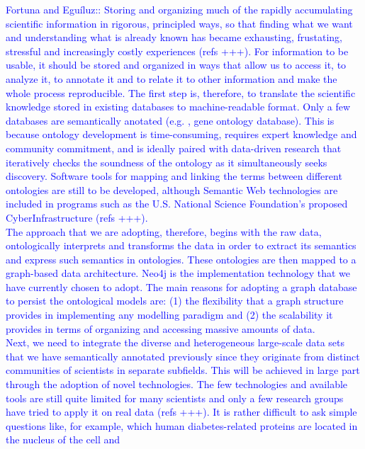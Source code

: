 \documentclass[11pt, a4paper]{article} %
\begin{document}
\textcolor{blue}{Fortuna and Egu\'iluz:: Storing and organizing much
  of the rapidly accumulating scientific information in rigorous,
  principled ways, so that finding what we want and understanding what
  is already known has became exhausting, frustating, stressful and
  increasingly costly experiences (refs +++). For information to be
  usable, it should be stored and organized in ways that allow us to
  access it, to analyze it, to annotate it and to relate it to other
  information and make the whole process reproducible. The first step
  is, therefore, to translate the scientific knowledge stored in
  existing databases to machine-readable format. Only a few databases
  are semantically anotated (e.g. , gene ontology database). This is
  because ontology development is time-consuming, requires expert
  knowledge and community commitment, and is ideally paired with
  data-driven research that iteratively checks the soundness of the
  ontology as it simultaneously seeks discovery. Software tools for
  mapping and linking the terms between different ontologies are still
  to be developed, although Semantic Web technologies are included in
  programs such as the U.S. National Science Foundation's proposed
  CyberInfrastructure (refs +++).\\
  The approach that we are adopting, therefore, begins with the raw
  data, ontologically interprets and transforms the data in order to
  extract its semantics and express such semantics in
  ontologies. These ontologies are then mapped to a graph-based data
  architecture. Neo4j is the implementation technology that we have
  currently chosen to adopt. The main reasons for adopting a graph
  database to persist the ontological models are: (1) the flexibility
  that a graph structure provides in implementing any modelling
  paradigm and (2) the scalability it provides in terms of organizing
  and accessing massive amounts of data.\\
  Next, we need to integrate the diverse and heterogeneous large-scale
  data sets that we have semantically annotated previously since they
  originate from distinct communities of scientists in separate
  subfields. This will be achieved in large part through the adoption
  of novel technologies. The few technologies and available tools are
  still quite limited for many scientists and only a few research
  groups have tried to apply it on real data (refs +++). It is rather
  difficult to ask simple questions like, for example, which human
  diabetes-related proteins are located in the nucleus of the cell and
}
\end{document}
